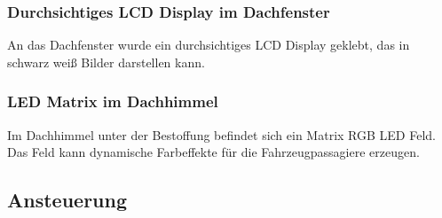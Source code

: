 \subsubsection{Durchsichtiges LCD Display im Dachfenster}
An das Dachfenster wurde ein durchsichtiges LCD Display geklebt, das in schwarz weiß Bilder darstellen kann.
\subsubsection{LED Matrix im Dachhimmel}
Im Dachhimmel unter der Bestoffung befindet sich ein Matrix RGB LED Feld. Das Feld kann dynamische Farbeffekte für die Fahrzeugpassagiere erzeugen.
\subsection{Ansteuerung}
